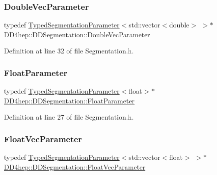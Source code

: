 \subsubsection{\texorpdfstring{Double\+Vec\+Parameter}{DoubleVecParameter}}
{\footnotesize\ttfamily typedef \hyperlink{class_d_d4hep_1_1_d_d_segmentation_1_1_typed_segmentation_parameter}{Typed\+Segmentation\+Parameter}$<$std\+::vector$<$double$>$ $>$$\ast$ \hyperlink{namespace_d_d4hep_1_1_d_d_segmentation_ae7964d33264473a9df6cfb5194cfb740}{D\+D4hep\+::\+D\+D\+Segmentation\+::\+Double\+Vec\+Parameter}}



Definition at line 32 of file Segmentation.\+h.

\hypertarget{namespace_d_d4hep_1_1_d_d_segmentation_a1f6134fdcd18b625bc940d064598090a}{}\label{namespace_d_d4hep_1_1_d_d_segmentation_a1f6134fdcd18b625bc940d064598090a} 
\subsubsection{\texorpdfstring{Float\+Parameter}{FloatParameter}}
{\footnotesize\ttfamily typedef \hyperlink{class_d_d4hep_1_1_d_d_segmentation_1_1_typed_segmentation_parameter}{Typed\+Segmentation\+Parameter}$<$float$>$$\ast$ \hyperlink{namespace_d_d4hep_1_1_d_d_segmentation_a1f6134fdcd18b625bc940d064598090a}{D\+D4hep\+::\+D\+D\+Segmentation\+::\+Float\+Parameter}}



Definition at line 27 of file Segmentation.\+h.

\hypertarget{namespace_d_d4hep_1_1_d_d_segmentation_ab7445ed6131fb76c39c0c2463062d95e}{}\label{namespace_d_d4hep_1_1_d_d_segmentation_ab7445ed6131fb76c39c0c2463062d95e} 
\subsubsection{\texorpdfstring{Float\+Vec\+Parameter}{FloatVecParameter}}
{\footnotesize\ttfamily typedef \hyperlink{class_d_d4hep_1_1_d_d_segmentation_1_1_typed_segmentation_parameter}{Typed\+Segmentation\+Parameter}$<$std\+::vector$<$float$>$ $>$$\ast$ \hyperlink{namespace_d_d4hep_1_1_d_d_segmentation_ab7445ed6131fb76c39c0c2463062d95e}{D\+D4hep\+::\+D\+D\+Segmentation\+::\+Float\+Vec\+Parameter}}



